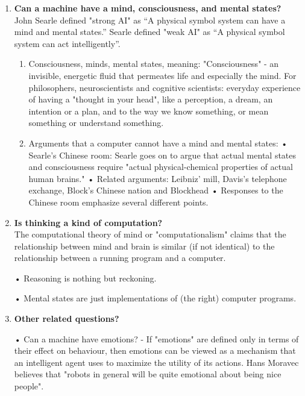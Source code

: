 \documentclass{article}
\begin{document}
{\begin{enumerate}
 •	The brain can be simulated
 
 • Human thinking is symbol processing: In 1963, Allen Newell and Herbert A. Simon proposed that "symbol manipulation" was the essence of both human and machine intelligence.
 
 •	Arguments against symbol processing:These arguments show that human thinking does not consist (solely) of high level symbol manipulation. Also arguments by Gödelian anti-mechanist arguments, Dreyfus.
	
 \item\textbf{Can a machine have a mind, consciousness, and mental states?} \\
 John Searle defined "strong AI" as “A physical symbol system can have a mind and mental states.” Searle defined "weak AI" as “A physical symbol system can act intelligently”. 
 
 \begin{enumerate}
 \item 	Consciousness, minds, mental states, meaning:
"Consciousness" - an invisible, energetic fluid that permeates life and especially the mind. For philosophers, neuroscientists and cognitive scientists: everyday experience of having a "thought in your head", like a perception, a dream, an intention or a plan, and to the way we know something, or mean something or understand something.
 \item Arguments that a computer cannot have a mind and mental states:
•	Searle's Chinese room: Searle goes on to argue that actual mental states and consciousness require "actual physical-chemical properties of actual human brains." 
•	Related arguments: Leibniz' mill, Davis's telephone exchange, Block's Chinese nation and Blockhead
•	Responses to the Chinese room emphasize several different points.
 \end{enumerate}

 \item\textbf{Is thinking a kind of computation?} \\
  The computational theory of mind or "computationalism" claims that the relationship between mind and brain is similar (if not identical) to the relationship between a running program and a computer. 
  
•	Reasoning is nothing but reckoning. 

•	Mental states are just implementations of (the right) computer programs.
 \item\textbf{Other related questions?}

• Can a machine have emotions? - If "emotions" are defined only in terms of their effect on behaviour, then emotions can be viewed as a mechanism that an intelligent agent uses to maximize the utility of its actions. Hans Moravec believes that "robots in general will be quite emotional about being nice people".


\end{enumerate}}
\end{document}
